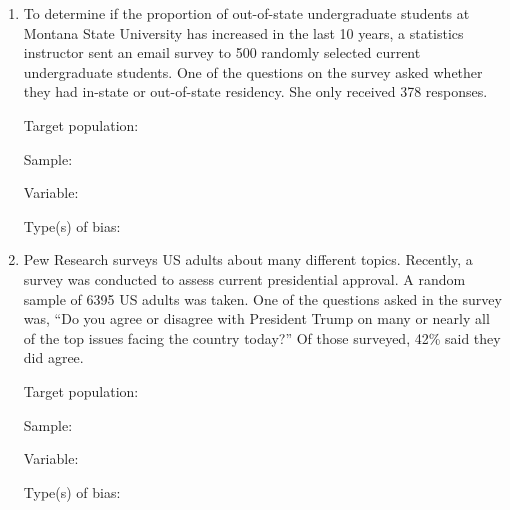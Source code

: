\documentclass[
]{report}
\begin{document}
\begin{enumerate}
\def\labelenumi{\arabic{enumi}.}
\item
  To determine if the proportion of out-of-state undergraduate students at Montana State University has increased in the last 10 years, a statistics instructor sent an email survey to 500 randomly selected current undergraduate students. One of the questions on the survey asked whether they had in-state or out-of-state residency. She only received 378 responses.
  \vspace{0.25in}

  Target population:
  \vspace{0.3in}

  Sample:
  \vspace{0.3in}

  Variable:
  \vspace{0.3in}

  Type(s) of bias:
  \vspace{0.3in}
\item
  Pew Research surveys US adults about many different topics. Recently, a survey was conducted to assess current presidential approval. A random sample of 6395 US adults was taken. One of the questions asked in the survey was, ``Do you agree or disagree with President Trump on many or nearly all of the top issues facing the country today?'' Of those surveyed, 42\% said they did agree.
  \vspace{0.25in}

  Target population:
  \vspace{0.3in}

  Sample:
  \vspace{0.3in}

  Variable:
  \vspace{0.3in}

  Type(s) of bias:
  \vspace{0.3in}
\end{enumerate}

\newpage
\end{document}
